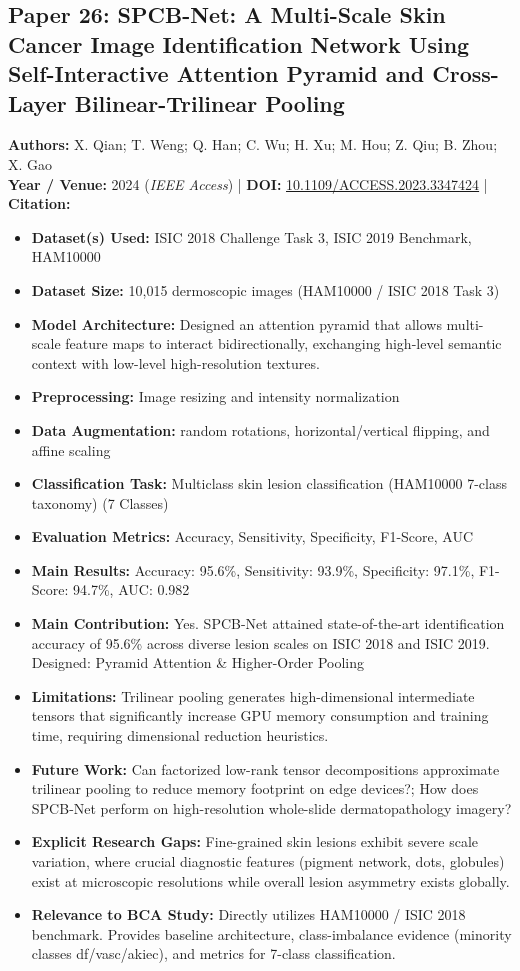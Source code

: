 \documentclass[11pt,a4paper]{article}
\begin{document}
\subsection{Paper 26: SPCB-Net: A Multi-Scale Skin Cancer Image Identification Network Using Self-Interactive Attention Pyramid and Cross-Layer Bilinear-Trilinear Pooling}
\textbf{Authors:} X. Qian; T. Weng; Q. Han; C. Wu; H. Xu; M. Hou; Z. Qiu; B. Zhou; X. Gao \\
\textbf{Year / Venue:} 2024 (\textit{IEEE Access}) | \textbf{DOI:} \href{https://doi.org/10.1109/ACCESS.2023.3347424}{10.1109/ACCESS.2023.3347424} | \textbf{Citation:} \cite{10374026}

\begin{itemize}\small
\item \textbf{Dataset(s) Used:} ISIC 2018 Challenge Task 3, ISIC 2019 Benchmark, HAM10000
\item \textbf{Dataset Size:} 10,015 dermoscopic images (HAM10000 / ISIC 2018 Task 3)
\item \textbf{Model Architecture:} Designed an attention pyramid that allows multi-scale feature maps to interact bidirectionally, exchanging high-level semantic context with low-level high-resolution textures.
\item \textbf{Preprocessing:} Image resizing and intensity normalization
\item \textbf{Data Augmentation:} random rotations, horizontal/vertical flipping, and affine scaling
\item \textbf{Classification Task:} Multiclass skin lesion classification (HAM10000 7-class taxonomy) (7 Classes)
\item \textbf{Evaluation Metrics:} Accuracy, Sensitivity, Specificity, F1-Score, AUC
\item \textbf{Main Results:} Accuracy: 95.6\%, Sensitivity: 93.9\%, Specificity: 97.1\%, F1-Score: 94.7\%, AUC: 0.982
\item \textbf{Main Contribution:} Yes. SPCB-Net attained state-of-the-art identification accuracy of 95.6\% across diverse lesion scales on ISIC 2018 and ISIC 2019. Designed: Pyramid Attention \& Higher-Order Pooling
\item \textbf{Limitations:} Trilinear pooling generates high-dimensional intermediate tensors that significantly increase GPU memory consumption and training time, requiring dimensional reduction heuristics.
\item \textbf{Future Work:} Can factorized low-rank tensor decompositions approximate trilinear pooling to reduce memory footprint on edge devices?; How does SPCB-Net perform on high-resolution whole-slide dermatopathology imagery?
\item \textbf{Explicit Research Gaps:} Fine-grained skin lesions exhibit severe scale variation, where crucial diagnostic features (pigment network, dots, globules) exist at microscopic resolutions while overall lesion asymmetry exists globally.
\item \textbf{Relevance to BCA Study:} Directly utilizes HAM10000 / ISIC 2018 benchmark. Provides baseline architecture, class-imbalance evidence (minority classes df/vasc/akiec), and metrics for 7-class classification.
\end{itemize}
\end{document}
